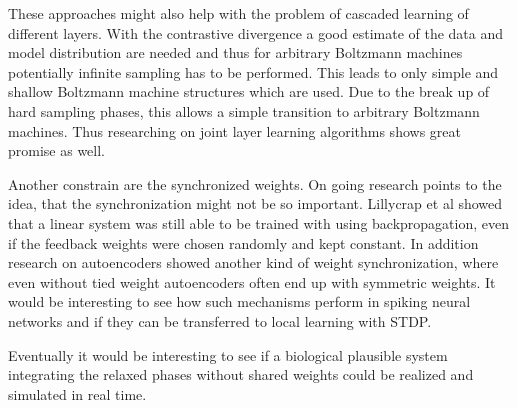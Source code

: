 These approaches might also help with the problem of cascaded learning of different layers.
With the contrastive divergence a good estimate of the data and model distribution are needed and thus for arbitrary Boltzmann machines potentially infinite sampling has to be performed.
This leads to only simple and shallow Boltzmann machine structures which are used.
Due to the break up of hard sampling phases, this allows a simple transition to arbitrary Boltzmann machines.
Thus researching on joint layer learning algorithms shows great promise as well.

Another constrain are the synchronized weights.
On going research points to the idea, that the synchronization might not be so important.
Lillycrap et al showed that a linear system was still able to be trained with using backpropagation, even if the feedback weights were chosen randomly and kept constant.
In addition research on autoencoders showed another kind of weight synchronization, where even without tied weight autoencoders often end up with symmetric weights.
It would be interesting to see how such mechanisms perform in spiking neural networks and if they can be transferred to local learning with STDP.

Eventually it would be interesting to see if a biological plausible system integrating the relaxed phases without shared weights could be realized and simulated in real time.
 